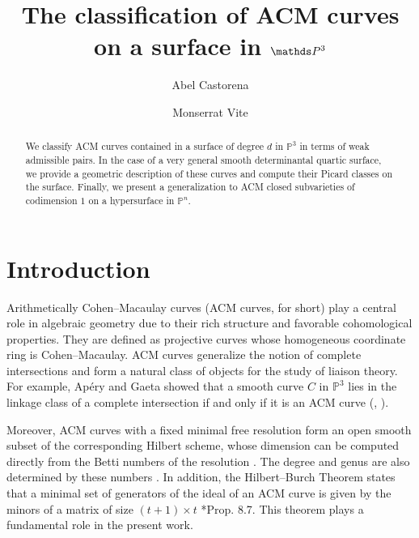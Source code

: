 \documentclass[12pt,reqno]{amsart}
\title{The classification of ACM curves on a surface in $\PPP$}
\author{Abel Castorena}
\author{Monserrat Vite}
\theoremstyle{plain}
\theoremstyle{definition}
\theoremstyle{remark}
\theoremstyle{definition}
\newcommand{\PP}{\mathds{P}}
\newcommand{\PPP}{\PP^{3}}
\begin{document}
\maketitle
\begin{abstract}
We classify ACM curves contained in a surface of degree $d$ in $\PPP$ in terms of weak admissible pairs. In the case of a very general smooth determinantal quartic surface, we provide a geometric description of these curves and compute their Picard classes on the surface. Finally, we present a generalization to ACM closed subvarieties of codimension $1$ on a hypersurface in $\PP^{n}$.
\end{abstract}
\section{Introduction}

Arithmetically Cohen--Macaulay curves (ACM curves, for short) play a central role in algebraic geometry due to their rich structure and favorable cohomological properties. They are defined as projective curves whose homogeneous coordinate ring is Cohen--Macaulay. ACM curves generalize the notion of complete intersections and form a natural class of objects for the study of liaison theory. For example, Apéry and Gaeta showed that a smooth curve $C$ in $\PPP$ lies in the linkage class of a complete intersection if and only if it is an ACM curve (\cite{apery}, \cite{gaeta}).\\

Moreover, ACM curves with a fixed minimal free resolution form an open smooth subset of the corresponding Hilbert scheme, whose dimension can be computed directly from the Betti numbers of the resolution \cite{ell}. The degree and genus are also determined by these numbers \cite{pesk}. In addition, the Hilbert--Burch Theorem states that a minimal set of generators of the ideal of an ACM curve is given by the minors of a matrix of size $(t+1)\times t$ \cite{har3}*{Prop. 8.7}. This theorem plays a fundamental role in the present work.\\
\end{document}
